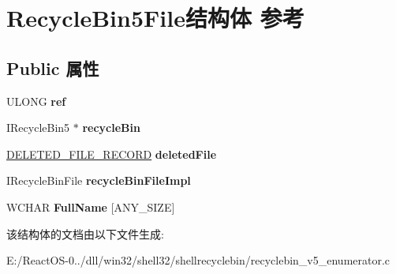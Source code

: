 \hypertarget{struct_recycle_bin5_file}{}\section{Recycle\+Bin5\+File结构体 参考}
\label{struct_recycle_bin5_file}
\subsection*{Public 属性}
\begin{DoxyCompactItemize}
\item 
\mbox{\label{struct_recycle_bin5_file_abb829daae09b09d5d30b8e168409b4e8}} 
U\+L\+O\+NG {\bfseries ref}
\item 
\mbox{\label{struct_recycle_bin5_file_aee41a34a47ec90fd8d379df42a8f4dc0}} 
I\+Recycle\+Bin5 $\ast$ {\bfseries recycle\+Bin}
\item 
\mbox{\label{struct_recycle_bin5_file_a07814f5839d56e55dcf1ebeaaf1b1a5a}} 
\hyperlink{struct___d_e_l_e_t_e_d___f_i_l_e___r_e_c_o_r_d}{D\+E\+L\+E\+T\+E\+D\+\_\+\+F\+I\+L\+E\+\_\+\+R\+E\+C\+O\+RD} {\bfseries deleted\+File}
\item 
\mbox{\label{struct_recycle_bin5_file_a1548e0fbaa10fd1c9ce338b762819b66}} 
I\+Recycle\+Bin\+File {\bfseries recycle\+Bin\+File\+Impl}
\item 
\mbox{\label{struct_recycle_bin5_file_a7a04c44b6aaea26553c3cd525fd1f411}} 
W\+C\+H\+AR {\bfseries Full\+Name} \mbox{[}A\+N\+Y\+\_\+\+S\+I\+ZE\mbox{]}
\end{DoxyCompactItemize}


该结构体的文档由以下文件生成\+:\begin{DoxyCompactItemize}
\item 
E\+:/\+React\+O\+S-\/0../dll/win32/shell32/shellrecyclebin/recyclebin\+\_\+v5\+\_\+enumerator.\+c\end{DoxyCompactItemize}
